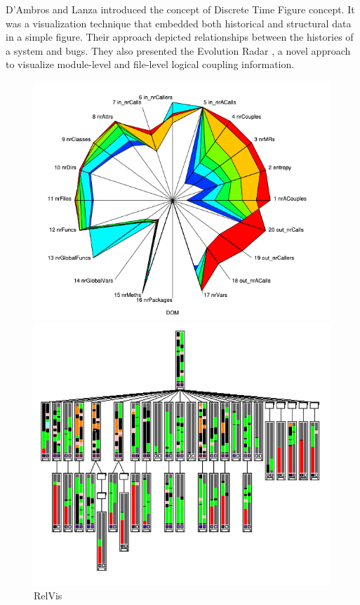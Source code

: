 D’Ambros and Lanza \cite{DAmbros2006} introduced the concept of Discrete Time Figure concept. It was a 
 visualization technique that embedded both historical and structural data in a simple figure. 
Their approach depicted relationships between the histories of a system and bugs. 
They also presented the Evolution Radar \cite{DAmbros2006a}, a novel approach to visualize module-level and file-level logical coupling information.

\begin{figure}[H]
    \includegraphics[width=\linewidth]{Pinzger2005_RelVis.png}
    \caption{RelVis}
  \endminipage\hfill
    \includegraphics[width=\linewidth]{DAmbros2006.png}

\end{figure}
